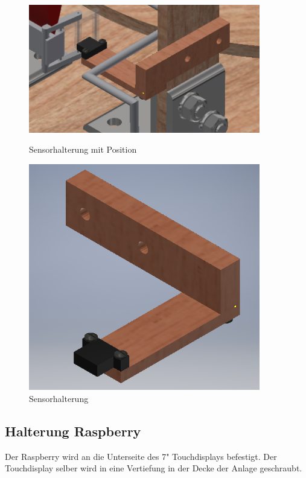 \begin{figure}[H]
  \begin{minipage}[hbt]{0.45\textwidth}
    \includegraphics[width=0.9\textwidth]{Bilder/Inventor/Sensorhalterung_Klemme}
 	\caption{Sensorhalterung mit Position}
  	\label{Sens_halt_mit_gesamt}
  \end{minipage}
\hspace{.03\linewidth}
  \begin{minipage}[hbt]{0.45\textwidth}
    \includegraphics[width=0.9\textwidth]{Bilder/Inventor/Sensorhalterung_Klemme_2}
  	\caption{Sensorhalterung}
  	\label{Sens_halt_allein}
  \end{minipage}
\end{figure}
\subsection{Halterung Raspberry}
Der Raspberry wird an die Unterseite des 7"  Touchdisplays befestigt. Der Touchdisplay selber wird in eine Vertiefung in der Decke der Anlage geschraubt. 
